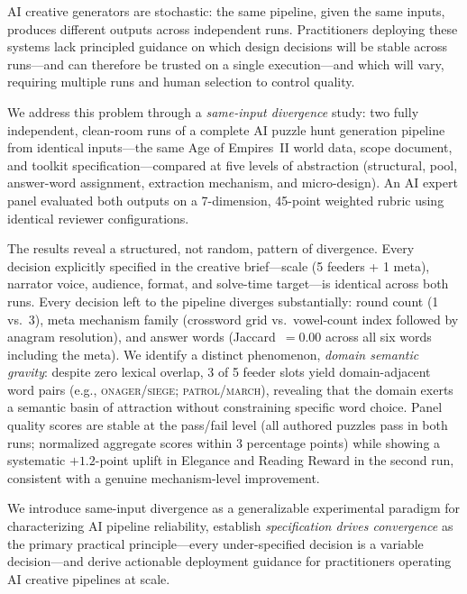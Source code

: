 AI creative generators are stochastic: the same pipeline, given the same inputs, produces
different outputs across independent runs. Practitioners deploying these systems lack principled
guidance on which design decisions will be stable across runs---and can therefore be trusted
on a single execution---and which will vary, requiring multiple runs and human selection
to control quality.

We address this problem through a \emph{same-input divergence} study: two fully independent,
clean-room runs of a complete AI puzzle hunt generation pipeline from identical inputs---the
same Age of Empires~II world data, scope document, and toolkit specification---compared at
five levels of abstraction (structural, pool, answer-word assignment, extraction mechanism,
and micro-design). An AI expert panel evaluated both outputs on a 7-dimension, 45-point
weighted rubric using identical reviewer configurations.

The results reveal a structured, not random, pattern of divergence. Every decision explicitly
specified in the creative brief---scale (5 feeders + 1 meta), narrator voice, audience,
format, and solve-time target---is identical across both runs. Every decision left to the
pipeline diverges substantially: round count (1 vs.~3), meta mechanism family (crossword
grid vs.~vowel-count index followed by anagram resolution), and answer words
(Jaccard~$= 0.00$ across all six words including the meta). We identify a distinct
phenomenon, \emph{domain semantic gravity}: despite zero lexical overlap, 3 of 5 feeder
slots yield domain-adjacent word pairs (e.g., \textsc{onager}/\textsc{siege};
\textsc{patrol}/\textsc{march}), revealing that the domain exerts a semantic basin of
attraction without constraining specific word choice. Panel quality scores are stable at
the pass/fail level (all authored puzzles pass in both runs; normalized aggregate scores
within 3 percentage points) while showing a systematic $+1.2$-point uplift in Elegance
and Reading Reward in the second run, consistent with a genuine mechanism-level improvement.

We introduce same-input divergence as a generalizable experimental paradigm for
characterizing AI pipeline reliability, establish \emph{specification drives convergence}
as the primary practical principle---every under-specified decision is a variable
decision---and derive actionable deployment guidance for practitioners operating AI creative
pipelines at scale.
